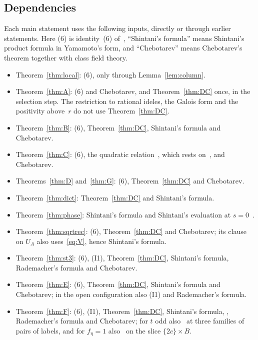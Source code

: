 \documentclass[11pt]{amsart}
\numberwithin{equation}{section}
\theoremstyle{plain}
\theoremstyle{definition}
\theoremstyle{remark}
\begin{document}
\subsection*{Dependencies}
Each main statement uses the following inputs, directly or through earlier statements. Here (6) is identity~(6) of~\cite{RW}, ``Shintani's formula'' means Shintani's product formula in Yamamoto's form, and ``Chebotarev'' means Chebotarev's theorem together with class field theory.
\begin{itemize}
\item Theorem~\ref{thm:local}: (6), only through Lemma~\ref{lem:column}.
\item Theorem~\ref{thm:A}: (6) and Chebotarev, and Theorem~\ref{thm:DC} once, in the selection step. The restriction to rational ideles, the Galois form and the positivity above~$r$ do not use Theorem~\ref{thm:DC}.
\item Theorem~\ref{thm:B}: (6), Theorem~\ref{thm:DC}, Shintani's formula and Chebotarev.
\item Theorem~\ref{thm:C}: (6), the quadratic relation~\cite[(39)]{RW}, which rests on~\cite[(7)]{RW}, and Chebotarev.
\item Theorems~\ref{thm:D} and~\ref{thm:G}: (6), Theorem~\ref{thm:DC} and Chebotarev.
\item Theorem~\ref{thm:dict}: Theorem~\ref{thm:DC} and Shintani's formula.
\item Theorem~\ref{thm:phase}: Shintani's formula and Shintani's evaluation at $s=0$~\cite{Sh76}.
\item Theorem~\ref{thm:sqrtrec}: (6), Theorem~\ref{thm:DC} and Chebotarev; its clause on $U_A$ also uses~\eqref{eq:V}, hence Shintani's formula.
\item Theorem~\ref{thm:st3}: (6), (I1), Theorem~\ref{thm:DC}, Shintani's formula, Rademacher's formula and Chebotarev.
\item Theorem~\ref{thm:E}: (6), Theorem~\ref{thm:DC}, Shintani's formula and Chebotarev; in the open configuration also (I1) and Rademacher's formula.
\item Theorem~\ref{thm:F}: (6), (I1), Theorem~\ref{thm:DC}, Shintani's formula, \cite{Sh76}, Rademacher's formula and Chebotarev; for $t$ odd also~\cite[(7)]{RW} at three families of pairs of labels, and for $f_\eta=1$ also~\cite[(36)]{RW} on the slice $\{2c\}\times B$.
\end{itemize}
\end{document}
